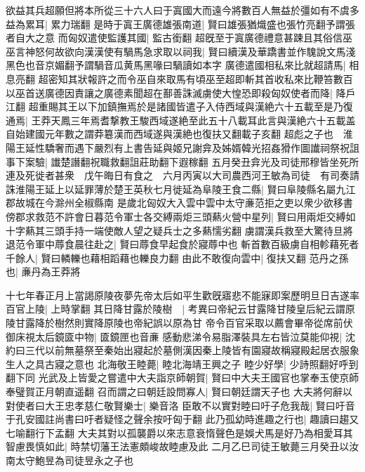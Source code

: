 欲益其兵超願但將本所從三十六人曰于寘國大而遠今將數百人無益於彊如有不虞多益為累耳|{
	累力瑞翻}
是時于寘王廣德雄張南道|{
	賢曰雄張猶熾盛也張竹亮翻予謂張者自大之意}
而匈奴遣使監護其國|{
	監古銜翻}
超旣至于寘廣德禮意甚踈且其俗信巫巫言神怒何故欲向漢漢使有騧馬急求取以祠我|{
	賢曰續漢及華蹻書並作騩說文馬淺黑色也音京媚翻予謂騧音瓜黄馬黑喙曰騧讀如本字}
廣德遣國相私來比就超請馬|{
	相息亮翻}
超密知其狀報許之而令巫自來取馬有頃巫至超即斬其首收私來比鞭笞數百以巫首送廣德因責讓之廣德素聞超在鄯善誅滅虜使大惶恐即殺匈奴使者而降|{
	降戶江翻}
超重賜其王以下加鎮撫焉於是諸國皆遣子入侍西域與漢絶六十五載至是乃復通焉|{
	王莽天鳳三年焉耆撃教王駿西域遂絶至此五十八載耳此言與漢絶六十五載盖自始建國元年數之謂莽簒漢而西域遂與漢絶也復扶又翻載子亥翻}
超彪之子也　淮陽王延性驕奢而遇下嚴烈有上書告延與姬兄謝弇及姊婿韓光招姦猾作圖䜟祠祭祝詛事下案驗|{
	䜟楚譖翻祝職救翻詛莊助翻下遐稼翻}
五月癸丑弇光及司徒邢穆皆坐死所連及死徙者甚衆　戊午晦日有食之　六月丙寅以大司農西河王敏為司徒　有司奏請誅淮陽王延上以延罪薄於楚王英秋七月徙延為阜陵王食二縣|{
	賢曰阜陵縣名屬九江郡故城在今滁州全椒縣南}
是歲北匈奴大入雲中雲中太守亷范拒之吏以衆少欲移書傍郡求救范不許會日暮范令軍士各交縛兩炬三頭爇火營中星列|{
	賢曰用兩炬交縛如十字爇其三頭手持一端使敵人望之疑兵士之多爇懦劣翻}
虜謂漢兵救至大驚待旦將退范令軍中蓐食晨往赴之|{
	賢曰蓐食早起食於寢蓐中也}
斬首數百級虜自相軫藉死者千餘人|{
	賢曰轔轢也藉相蹈藉也轢良力翻}
由此不敢復向雲中|{
	復扶又翻}
范丹之孫也|{
	亷丹為王莽將}


十七年春正月上當謁原陵夜夢先帝太后如平生歡旣寤悲不能寐即案歷明旦日吉遂率百官上陵|{
	上時掌翻}
其日降甘露於陵樹　|{
	考異曰帝紀云甘露降甘陵皇后紀云謂原陵甘露降於樹然則實降原陵也帝紀誤以原為甘}
帝令百官采取以薦會畢帝從席前伏御床視太后鏡匳中物|{
	匳鏡匣也音亷}
感動悲涕令易脂澤裝具左右皆泣莫能仰視|{
	沈約曰三代以前無墓祭至秦始出寢起於墓側漢因秦上陵皆有園寢故稱寢殿起居衣服象生人之具古寢之意也}
北海敬王睦薨|{
	睦北海靖王興之子}
睦少好學|{
	少詩照翻好呼到翻下同}
光武及上皆愛之嘗遣中大夫詣京師朝賀|{
	賢曰中大夫王國官也掌奉玉使京師奉璧賀正月朝直遥翻}
召而謂之曰朝廷設問寡人|{
	賢曰朝廷謂天子也}
大夫將何辭以對使者曰大王忠孝慈仁敬賢樂士|{
	樂音洛}
臣敢不以實對睦曰吁子危我哉|{
	賢曰吁音于孔安國註尚書曰吁者疑怪之聲余按吁匈于翻}
此乃孤幼時進趣之行也|{
	趣讀曰趨又七喻翻行下孟翻}
大夫其對以孤襲爵以來志意衰惰聲色是娛犬馬是好乃為相愛耳其智慮畏慎如此|{
	時禁切藩王法憲頗峻故睦慮及此}
二月乙巳司徒王敏薨三月癸丑以汝南太守鮑昱為司徒昱永之子也

